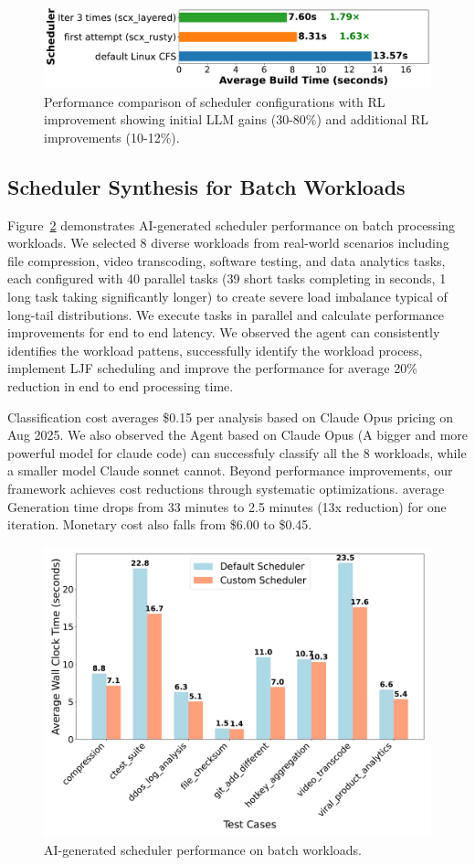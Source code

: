 \begin{figure}[h]
\centering
\includegraphics[width=0.9\columnwidth]{sections/Linux_build_benchmark_results.pdf}
\caption{Performance comparison of scheduler configurations with RL improvement showing initial LLM gains (30-80\%) and additional RL improvements (10-12\%).}
\label{fig:performance-comparison}
\end{figure}

\subsection{Scheduler Synthesis for Batch Workloads}

Figure~\ref{fig:batch-performance} demonstrates AI-generated scheduler performance on batch processing workloads. We selected 8 diverse workloads from real-world scenarios including file compression, video transcoding, software testing, and data analytics tasks, each configured with 40 parallel tasks (39 short tasks completing in seconds, 1 long task taking significantly longer) to create severe load imbalance typical of long-tail distributions. We execute tasks in parallel and calculate performance improvements for end to end latency. We observed the agent can consistently identifies the workload pattens, successfully identify the workload process, implement LJF scheduling and improve the performance for average 20\% reduction in end to end processing time.

Classification cost averages \$0.15 per analysis based on Claude Opus pricing on Aug 2025. We also observed the Agent based on Claude Opus (A bigger and more powerful model for claude code) can successfuly classify all the 8 workloads, while a smaller model Claude sonnet cannot. Beyond performance improvements, our framework achieves cost reductions through systematic optimizations. average Generation time drops from 33 minutes to 2.5 minutes (13x reduction) for one iteration. Monetary cost also falls from \$6.00 to \$0.45.

\begin{figure}[h]
\centering
\includegraphics[width=0.9\columnwidth]{sections/scheduler_performance_comparison.pdf}
\caption{AI-generated scheduler performance on batch workloads.}
\label{fig:batch-performance}
\end{figure}


